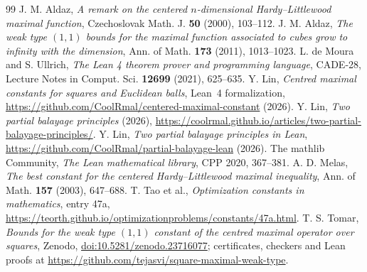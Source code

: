 \documentclass[11pt]{amsart}
\theoremstyle{definition}
\theoremstyle{remark}
\begin{document}
\begin{thebibliography}{99}
 J. M. Aldaz, \emph{A remark on the centered $n$-dimensional Hardy--Littlewood maximal
  function}, Czechoslovak Math. J. \textbf{50} (2000), 103--112.
 J. M. Aldaz, \emph{The weak type $(1,1)$ bounds for the maximal function associated to
  cubes grow to infinity with the dimension}, Ann. of Math. \textbf{173} (2011), 1013--1023.
 L. de Moura and S. Ullrich, \emph{The Lean 4 theorem prover and programming language},
  CADE-28, Lecture Notes in Comput. Sci. \textbf{12699} (2021), 625--635.
 Y. Lin, \emph{Centred maximal constants for squares and Euclidean balls}, Lean~4
  formalization, \url{https://github.com/CoolRmal/centered-maximal-constant} (2026).
 Y. Lin, \emph{Two partial balayage principles} (2026),
  \url{https://coolrmal.github.io/articles/two-partial-balayage-principles/}.
 Y. Lin, \emph{Two partial balayage principles in Lean},
  \url{https://github.com/CoolRmal/partial-balayage-lean} (2026).
 The mathlib Community, \emph{The Lean mathematical library}, CPP 2020, 367--381.
 A. D. Melas, \emph{The best constant for the centered Hardy--Littlewood maximal
  inequality}, Ann. of Math. \textbf{157} (2003), 647--688.
 T. Tao et al., \emph{Optimization constants in mathematics}, entry 47a,
  \url{https://teorth.github.io/optimizationproblems/constants/47a.html}.
 T. S. Tomar, \emph{Bounds for the weak type $(1,1)$ constant of the centred maximal operator
  over squares}, Zenodo, \href{https://doi.org/10.5281/zenodo.23716077}{doi:10.5281/zenodo.23716077};
  certificates, checkers and Lean proofs at \url{https://github.com/tejasvi/square-maximal-weak-type}.
\end{thebibliography}
\end{document}
